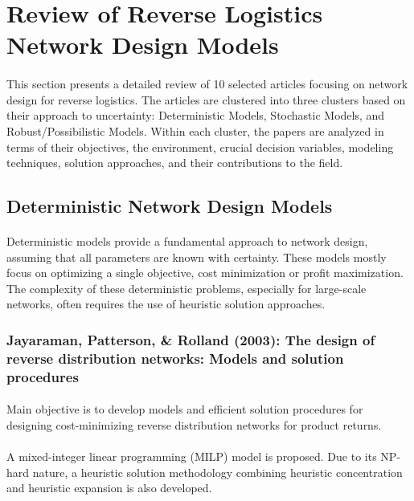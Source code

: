 \section{Review of Reverse Logistics Network Design Models}

\paragraph{} This section presents a detailed review of 10 selected articles focusing on network design for reverse logistics. The articles are clustered into three clusters based on their approach to uncertainty: Deterministic Models, Stochastic Models, and Robust/Possibilistic Models. Within each cluster, the papers are analyzed in terms of their objectives, the environment, crucial decision variables, modeling techniques, solution approaches, and their contributions to the field.

\subsection{Deterministic Network Design Models}
\paragraph{} Deterministic models provide a fundamental approach to network design, assuming that all parameters are known with certainty. These models mostly focus on optimizing a single objective, cost minimization or profit maximization. The complexity of these deterministic problems, especially for large-scale networks, often requires the use of heuristic solution approaches.

\subsubsection{Jayaraman, Patterson, \& Rolland (2003): The design of reverse distribution networks: Models and solution procedures}

\paragraph{} Main objective is to develop models and efficient solution procedures for designing cost-minimizing reverse distribution networks for product returns.

\paragraph{} A mixed-integer linear programming (MILP) model is proposed. Due to its NP-hard nature, a heuristic solution methodology combining heuristic concentration and heuristic expansion is also developed.

